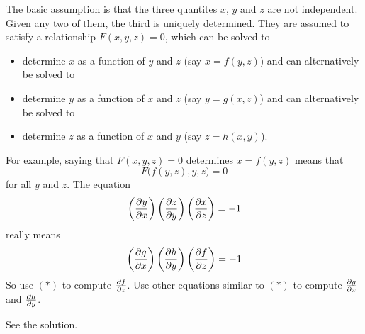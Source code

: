 \begin{hint}
The basic assumption is that the three quantites $x$, $y$
and $z$ are not independent. Given any two of them, the third is uniquely
determined. They are assumed to satisfy a relationship
$F(x,y,z)=0$, which can be solved to
\begin{itemize}\itemsep1pt \parskip0pt  %
\item
determine $x$ as a function of $y$ and $z$ (say $x=f(y,z)$) and 
can alternatively be solved to
\item
determine $y$ as a function of $x$ and $z$ (say $y=g(x,z)$) and 
can alternatively be solved to
\item
determine $z$ as a function of $x$ and $y$
(say $z=h(x,y)$). 
\end{itemize}
For example, saying that  $F(x,y,z)=0$ determines $x=f(y,z)$ means that 
\begin{equation*}
F\big(f(y,z),y,z\big)=0
\tag{$*$}
\end{equation*}
for all $y$ and $z$. The equation 
\begin{equation*}
\left(\pdiff{y}{x}\right)
\left(\pdiff{z}{y}\right)
\left(\pdiff{x}{z}\right)=-1
\end{equation*}
really means
\begin{equation*}
\left(\pdiff{g}{x}\right)
\left(\pdiff{h}{y}\right)
\left(\pdiff{f}{z}\right)=-1
\end{equation*}
So use $(*)$ to compute $\pdiff{f}{z}$.  Use other equations similar to $(*)$
to compute $\pdiff{g}{x}$ and $\pdiff{h}{y}$.
\end{hint}

\begin{answer}
See the solution.
\end{answer}

